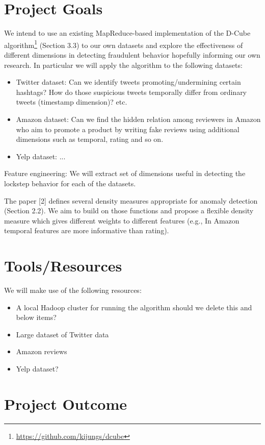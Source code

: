 \documentclass[12pt]{article}
\begin{document}
\section{Project Goals}

We intend to use an existing MapReduce-based implementation of the D-Cube algorithm\footnote{\href{https://github.com/kijungs/dcube}{https://github.com/kijungs/dcube}} (Section 3.3) to our own datasets and explore the effectiveness of different dimensions in detecting fraudulent behavior hopefully informing our own research. In particular we will apply the algorithm to the following datasets:
\begin{itemize}
\item Twitter dataset: Can we identify tweets promoting/undermining certain hashtags? How do those suspicious tweets temporally differ from ordinary tweets (timestamp dimension)? etc. 
\item Amazon dataset: Can we find the hidden relation among reviewers in Amazon who aim to promote a product by writing fake reviews using  additional dimensions such as temporal, rating and so on.  
\item Yelp dataset: ...
\end{itemize}

Feature engineering: We will extract set of dimensions useful in detecting the lockstep behavior for each of the datasets.	

The paper [2] defines several density measures appropriate for anomaly detection (Section 2.2). We aim to build on those functions and propose a flexible density measure which gives different weights to different features (e.g., In Amazon temporal features are more informative than rating).  
 
\section{Tools/Resources}
We will make use of the following resources:
\begin{itemize}
	\item A local Hadoop cluster for running the algorithm
should we delete this and below items?
	\item Large dataset of Twitter data
	\item Amazon reviews
	\item Yelp dataset?
\end{itemize}

\section{Project Outcome}
\end{document}
